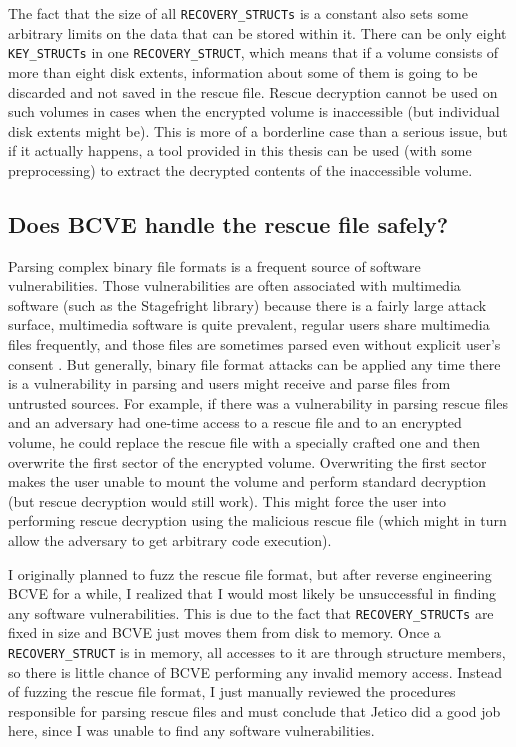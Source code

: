 \documentclass[thesis=B,english]{FITthesis}[2012/10/20]
\begin{document}
	The fact that the size of all \verb|RECOVERY_STRUCTs| is a constant also sets some arbitrary limits on the data that can be stored within it. There can be only eight \verb|KEY_STRUCTs| in one \verb|RECOVERY_STRUCT|, which means that if a volume consists of more than eight disk extents, information about some of them is going to be discarded and not saved in the rescue file. Rescue decryption cannot be used on such volumes in cases when the encrypted volume is inaccessible (but individual disk extents might be). This is more of a borderline case than a serious issue, but if it actually happens, a tool provided in this thesis can be used (with some preprocessing) to extract the decrypted contents of the inaccessible volume.
	
	\subsection{Does BCVE handle the rescue file safely?}
	
	Parsing complex binary file formats is a frequent source of software vulnerabilities. Those vulnerabilities are often associated with multimedia software (such as the Stagefright library) because there is a fairly large attack surface, multimedia software is quite prevalent, regular users share multimedia files frequently, and those files are sometimes parsed even without explicit user's consent \cite{multimedia}. But generally, binary file format attacks can be applied any time there is a vulnerability in parsing and users might receive and parse files from untrusted sources. For example, if there was a vulnerability in parsing rescue files and an adversary had one-time access to a rescue file and to an encrypted volume, he could replace the rescue file with a specially crafted one and then overwrite the first sector of the encrypted volume. Overwriting the first sector makes the user unable to mount the volume and perform standard decryption (but rescue decryption would still work). This might force the user into performing rescue decryption using the malicious rescue file (which might in turn allow the adversary to get arbitrary code execution).
	
	I originally planned to fuzz the rescue file format, but after reverse engineering BCVE for a while, I realized that I would most likely be unsuccessful in finding any software vulnerabilities. This is due to the fact that \verb|RECOVERY_STRUCTs| are fixed in size and BCVE just moves them from disk to memory. Once a \verb|RECOVERY_STRUCT| is in memory, all accesses to it are through structure members, so there is little chance of BCVE performing any invalid memory access. Instead of fuzzing the rescue file format, I just manually reviewed the procedures responsible for parsing rescue files and must conclude that Jetico did a good job here, since I was unable to find any software vulnerabilities.
	
\end{document}
